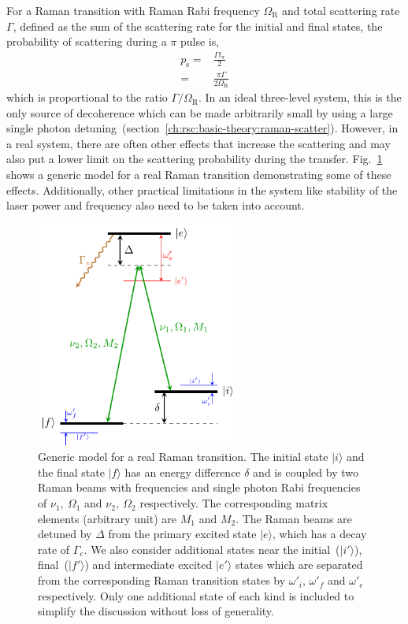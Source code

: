 For a Raman transition with Raman Rabi frequency $\Omega_{\mathrm{R}}$ and total scattering rate
$\Gamma$, defined as the sum of the scattering rate for the initial and final states,
the probability of scattering during a $\pi$ pulse is,
\begin{align*}
  p_{\mathrm{s}}=&\frac{\Gamma t_{\pi}}{2}\\
  =&\frac{\pi\Gamma}{2\Omega_{\mathrm{R}}}
\end{align*}
which is proportional to the ratio $\Gamma/\Omega_{\mathrm{R}}$.
In an ideal three-level system, this is the only source of decoherence
which can be made arbitrarily small by using a large
single photon detuning~(section~\ref{ch:rsc:basic-theory:raman-scatter}).
However, in a real system, there are often other effects that increase the scattering
and may also put a lower limit on the scattering probability during the transfer.
Fig.~\ref{fig:raman-transfer:generic-raman-model} shows a generic model
for a real Raman transition demonstrating some of these effects.
Additionally, other practical limitations in the system like stability of the laser power
and frequency also need to be taken into account.

\begin{figure}
  \centering
  \includegraphics[width=0.6\textwidth]{figures/raman_transfer_generic_raman_model.pdf}
  \caption[Generic model for a real Raman transition]{
    Generic model for a real Raman transition.
    The initial state $|i\rangle$ and the final state $|f\rangle$
    has an energy difference $\delta$
    and is coupled by two Raman beams with frequencies and
    single photon Rabi frequencies of $\nu_1,\ \Omega_1$ and $\nu_2,\ \Omega_2$ respectively.
    The corresponding matrix elements (arbitrary unit) are $M_1$ and $M_2$.
    The Raman beams are detuned by $\Delta$ from the primary excited state $|e\rangle$,
    which has a decay rate of $\Gamma_e$.
    We also consider additional states near the initial~($|i'\rangle$),
    final~($|f'\rangle$) and intermediate excited $|e'\rangle$ states which are
    separated from the corresponding Raman transition states by $\omega'_i$,
    $\omega'_f$ and $\omega'_e$ respectively.
    Only one additional state of each kind is included to simplify the discussion
    without loss of generality.
    \label{fig:raman-transfer:generic-raman-model}}
\end{figure}

